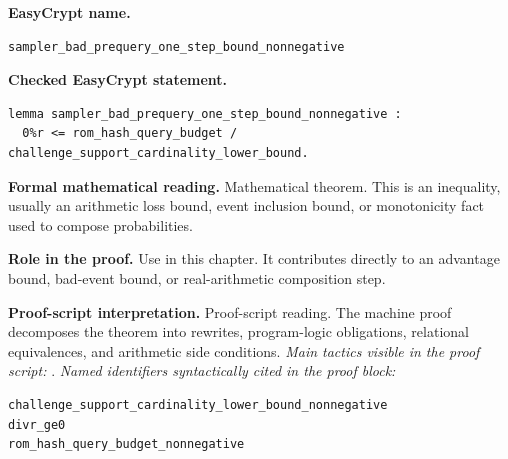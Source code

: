 \begin{formaltheorem}
\noindent\textbf{EasyCrypt name.}
\begin{lstlisting}[language=EasyCrypt,basicstyle=\ttfamily\scriptsize]
sampler_bad_prequery_one_step_bound_nonnegative
\end{lstlisting}
\noindent\textbf{Checked EasyCrypt statement.}
\begin{lstlisting}[language=EasyCrypt,basicstyle=\ttfamily\scriptsize]
lemma sampler_bad_prequery_one_step_bound_nonnegative :
  0%r <= rom_hash_query_budget / challenge_support_cardinality_lower_bound.
\end{lstlisting}
\noindent\textbf{Formal mathematical reading.}
Mathematical theorem. This is an inequality, usually an arithmetic loss bound, event inclusion bound, or monotonicity fact used to compose probabilities.

\noindent\textbf{Role in the proof.}
Use in this chapter. It contributes directly to an advantage bound, bad-event bound, or real-arithmetic composition step.

\noindent\textbf{Proof-script interpretation.}
Proof-script reading. The machine proof decomposes the theorem into rewrites, program-logic obligations, relational equivalences, and arithmetic side conditions.
\emph{Main tactics visible in the proof script:} .
\emph{Named identifiers syntactically cited in the proof block:}
\begin{lstlisting}[language=EasyCrypt,basicstyle=\ttfamily\scriptsize]
challenge_support_cardinality_lower_bound_nonnegative
divr_ge0
rom_hash_query_budget_nonnegative
\end{lstlisting}

\end{formaltheorem}

